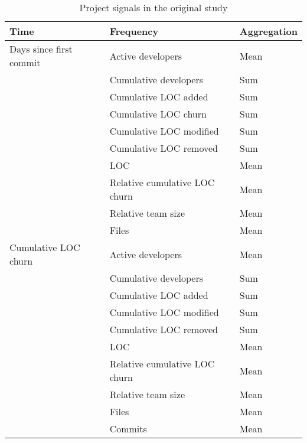 \newcommand{\tableHeadSeries}{\bfseries{Time}\rm & \bfseries{Frequency}\rm &
\bfseries{Aggregation}\rm}
\begin{table}[H]
\caption{Project signals in the original study}\label{table:karus_series}
\centering
\begin{tabular}{lll}
	\hline
	\tableHeadSeries \\
	\hline
	Days since first commit & Active developers & Mean \\
	& Cumulative developers & Sum \\
	& Cumulative LOC added & Sum \\
	& Cumulative LOC churn & Sum \\
	& Cumulative LOC modified & Sum \\
	& Cumulative LOC removed & Sum \\
	& LOC & Mean \\
	& Relative cumulative LOC churn & Mean \\
	& Relative team size & Mean \\
	& Files & Mean \\
	\hline
	\hline
	Cumulative LOC churn & Active developers & Mean \\
	& Cumulative developers & Sum \\
	& Cumulative LOC added & Sum \\
	& Cumulative LOC modified & Sum \\
	& Cumulative LOC removed & Sum \\
	& LOC & Mean \\
	& Relative cumulative LOC churn & Mean \\
	& Relative team size & Mean \\
	& Files & Mean \\
	& Commits & Mean \\
	\hline
\end{tabular}
\end{table}